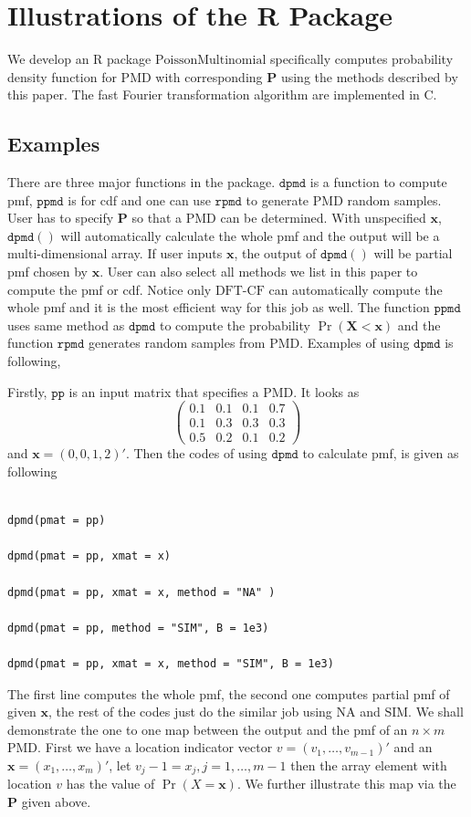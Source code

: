 \documentclass[12pt]{article}
\newcommand{\Pmat}{\mathbf{P}}
\newcommand{\PMD}{\textrm{PMD}}
\newcommand{\Xvec}{\boldsymbol{X}}
\newcommand{\xvec}{\boldsymbol{x}}
\newcommand{\code}{\texttt}
\newcommand{\SIM}{{\textrm{SIM}}}
\newcommand{\NA}{{\textrm{NA}}}
\newcommand{\dft}{{\textrm{DFT-CF}}}
\begin{document}
\section{Illustrations of the R Package}
We develop an R package $\textrm{PoissonMultinomial}$ specifically computes probability density function for $\PMD$ with corresponding $\Pmat$ using the methods described by this paper. The fast Fourier transformation algorithm are implemented in C.
\subsection{Examples}
There are three major functions in the package. $\code{dpmd}$ is a function to compute pmf, $\code{ppmd}$ is for cdf and one can use $\code{rpmd}$ to generate $\PMD$ random samples. User has to specify $\Pmat$ so that a $\PMD$ can be determined. With unspecified $\xvec$, $\code{dpmd}( )$ will automatically calculate the whole pmf and the output will be a multi-dimensional array. If user inputs $\xvec$, the output of $\code{dpmd}( )$ will be partial pmf chosen by $\xvec$. User can also select all methods we list in this paper to compute the pmf or cdf. Notice only $\dft$ can automatically compute the whole pmf and it is the most efficient way for this job as well. The function $\code{ppmd}$ uses same method as $\code{dpmd}$ to compute the probability $\Pr(\Xvec < \xvec)$ and the function $\code{rpmd}$ generates random samples from $\PMD$.  Examples of using $\code{dpmd}$ is following,

Firstly, $\code{pp}$ is an input matrix that specifies a $\PMD$. It looks as
$$
\begin{pmatrix}
0.1 & 0.1 & 0.1& 0.7\\
0.1 &0.3 & 0.3 & 0.3\\
0.5  &0.2 & 0.1 & 0.2
\end{pmatrix}
$$
and $\xvec=(0,0,1,2)'$. Then the codes of using $\code{dpmd}$ to calculate pmf, is given as following
\begin{lstlisting}

dpmd(pmat = pp)

dpmd(pmat = pp, xmat = x)

dpmd(pmat = pp, xmat = x, method = "NA" )

dpmd(pmat = pp, method = "SIM", B = 1e3)

dpmd(pmat = pp, xmat = x, method = "SIM", B = 1e3)
\end{lstlisting}
The first line computes the whole pmf, the second one computes partial pmf of given $\xvec$, the rest of the codes just do the similar job using $\NA$ and $\SIM$.
We shall demonstrate the one to one map between the output and the pmf of an $n \times m$ $\PMD$. First we have a location indicator vector $v = (v_1, \dots, v_{m-1})'$ and an $\xvec=(x_1,\dots,x_m)'$, let $v_j-1 = x_j, j =1,\dots,m-1$ then the array element with location $v$ has the value of $\Pr(X=\xvec)$. We further illustrate this map via the $\Pmat$ given above.
\end{document}
